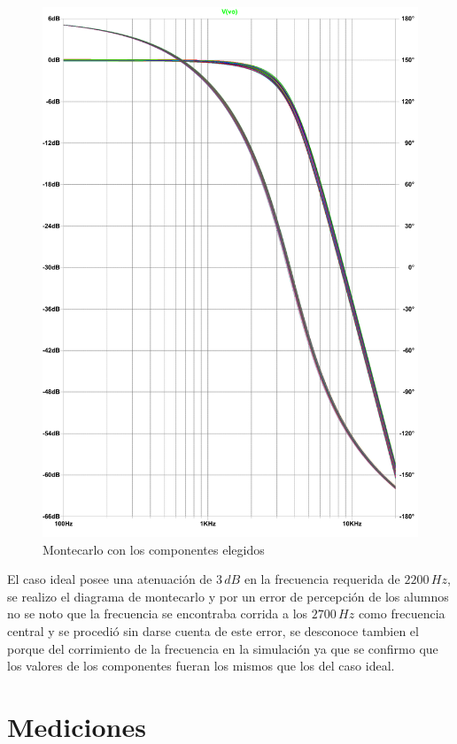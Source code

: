 \documentclass[11pt, a4paper]{article}
\begin{document}
\begin{figure}[H]
	\centering
	\includegraphics[scale=0.5]{montecarlobesselMAL.pdf}
	\caption{Montecarlo con los componentes elegidos}
	\label{fig:montecarlobessel}
\end{figure}

	El caso ideal posee una atenuación de $3 \, dB$ en la frecuencia requerida de $2200 \, Hz$, se realizo el diagrama de montecarlo y por un error de percepción de los alumnos no se noto que la frecuencia se encontraba corrida a los $2700 \, Hz$ como frecuencia central y se procedió sin darse cuenta de este error, se desconoce tambien el porque del corrimiento de la frecuencia en la simulación ya que se confirmo que los valores de los componentes fueran los mismos que los del caso ideal.
\section{Mediciones}
	
\end{document}
